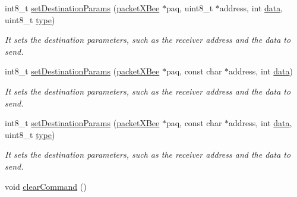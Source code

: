 \begin{DoxyCompactItemize}
int8\+\_\+t \hyperlink{class_wasp_x_bee_core_afe081c503b9cd892860ea53817da90bd}{set\+Destination\+Params} (\hyperlink{structpacket_x_bee}{packet\+X\+Bee} $\ast$paq, uint8\+\_\+t $\ast$address, int \hyperlink{class_wasp_x_bee_core_a81f1c2af5c45fc8e3b63f8f21b3df17f}{data}, uint8\+\_\+t \hyperlink{_sd_fat_structs_8h_a1d127017fb298b889f4ba24752d08b8e}{type})
\begin{DoxyCompactList}\small\item\em It sets the destination parameters, such as the receiver address and the data to send. \end{DoxyCompactList}\item 
int8\+\_\+t \hyperlink{class_wasp_x_bee_core_a76e4a2246e6f3d6f0462248c8972e081}{set\+Destination\+Params} (\hyperlink{structpacket_x_bee}{packet\+X\+Bee} $\ast$paq, const char $\ast$address, int \hyperlink{class_wasp_x_bee_core_a81f1c2af5c45fc8e3b63f8f21b3df17f}{data})
\begin{DoxyCompactList}\small\item\em It sets the destination parameters, such as the receiver address and the data to send. \end{DoxyCompactList}\item 
int8\+\_\+t \hyperlink{class_wasp_x_bee_core_aa09593fda9ed2aba1a5310d45c64c3ba}{set\+Destination\+Params} (\hyperlink{structpacket_x_bee}{packet\+X\+Bee} $\ast$paq, const char $\ast$address, int \hyperlink{class_wasp_x_bee_core_a81f1c2af5c45fc8e3b63f8f21b3df17f}{data}, uint8\+\_\+t \hyperlink{_sd_fat_structs_8h_a1d127017fb298b889f4ba24752d08b8e}{type})
\begin{DoxyCompactList}\small\item\em It sets the destination parameters, such as the receiver address and the data to send. \end{DoxyCompactList}\item 
void \hyperlink{class_wasp_x_bee_core_a8e1c290cb5b1a3ab686adf66e4959fd7}{clear\+Command} ()\hypertarget{class_wasp_x_bee_core_a8e1c290cb5b1a3ab686adf66e4959fd7}{}\label{class_wasp_x_bee_core_a8e1c290cb5b1a3ab686adf66e4959fd7}


\end{DoxyCompactItemize}
